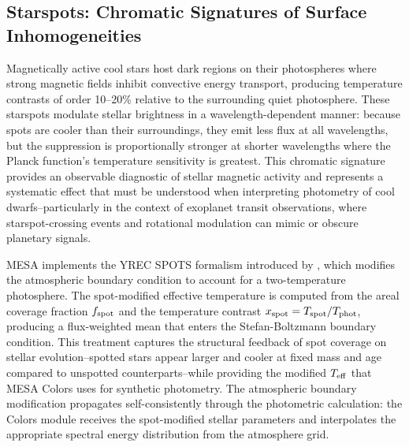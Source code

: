 \documentclass[linenumbers,apj,twocolumn, floatfix]{aastex701}
\begin{document}
\subsection{Starspots: Chromatic Signatures of Surface Inhomogeneities}
\label{sec:demo_starspots}

Magnetically active cool stars host dark regions on their photospheres where strong magnetic fields inhibit convective energy transport, producing temperature contrasts of order 10--20\% relative to the surrounding quiet photosphere.
These starspots modulate stellar brightness in a wavelength-dependent manner: because spots are cooler than their surroundings, they emit less flux at all wavelengths, but the suppression is proportionally stronger at shorter wavelengths where the Planck function's temperature sensitivity is greatest.
This chromatic signature provides an observable diagnostic of stellar magnetic activity and represents a systematic effect that must be understood when interpreting photometry of cool dwarfs--particularly in the context of exoplanet transit observations, where starspot-crossing events and rotational modulation can mimic or obscure planetary signals.

MESA implements the YREC SPOTS formalism introduced by \citet{Somers2015}, which modifies the atmospheric boundary condition to account for a two-temperature photosphere.
The spot-modified effective temperature is computed from the areal coverage fraction $f_{\rm spot}$ and the temperature contrast $x_{\rm spot} = T_{\rm spot}/T_{\rm phot}$, producing a flux-weighted mean that enters the Stefan-Boltzmann boundary condition.
This treatment captures the structural feedback of spot coverage on stellar evolution--spotted stars appear larger and cooler at fixed mass and age compared to unspotted counterparts--while providing the modified $T_{\rm eff}$ that MESA Colors uses for synthetic photometry.
The atmospheric boundary modification propagates self-consistently through the photometric calculation: the Colors module receives the spot-modified stellar parameters and interpolates the appropriate spectral energy distribution from the atmosphere grid.
\end{document}
